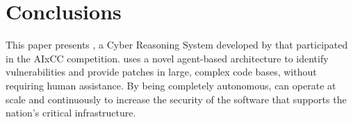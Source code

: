 \section{Conclusions}
\label{conclusions}

This paper presents \artiphishell, a Cyber Reasoning System developed by \shellphish that participated in the AIxCC competition.
\artiphishell uses a novel agent-based architecture to identify vulnerabilities and provide patches in large, complex code bases, without requiring human assistance.
By being completely autonomous, \artiphishell can operate at scale and continuously to increase the security of the software that supports the nation's critical infrastructure. 